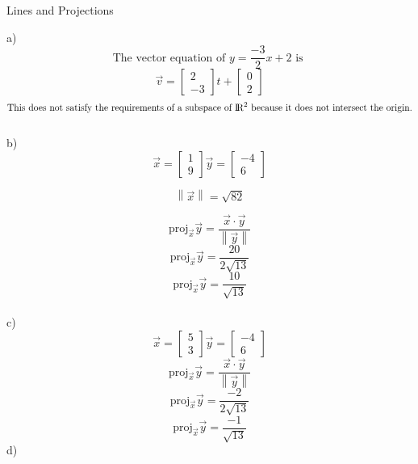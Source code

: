 \documentclass[12pt]{article}
\newcommand{\dbarl}{\left\lVert}
\newcommand{\dbarr}{\right\rVert}
\newenvironment{problem}[2][Problem]{\begin{trivlist}
\item[\hskip \labelsep {\bfseries #1}\hskip \labelsep {\bfseries #2.}]}{\end{trivlist}}
\begin{document}
\begin{problem}{5}
	Lines and Projections
\end{problem}
a)\\
	\[\text{The vector equation of } y=\frac{-3}{2}x + 2 \text{ is }\]
	\[\vec v = \left[\begin{matrix} 2\\-3 \end{matrix}\right]t + \left[\begin{matrix} 0\\2 \end{matrix}\right]\]
	\[\text{This does not satisfy the requirements of a subspace of } \rm I\!R^2 \text{ because it does not intersect the origin.}\]\\
b)\\
	\[\vec x = \left[\begin{matrix} 1\\9\end{matrix}\right] \vec y = \left[\begin{matrix} -4\\6\end{matrix}\right]\]

	\[\dbarl \vec x \dbarr = \sqrt{82}\]

	\[\text{proj}_{\vec{x}}\vec y = \frac{\vec x \cdot \vec y}{\dbarl\vec y\dbarr} \]
	\[\text{proj}_{\vec{x}}\vec y = \frac{20}{2\sqrt{13}}\]
	\[\text{proj}_{\vec{x}}\vec y = \frac{10}{\sqrt{13}}\]\\
c)\\
	\[\vec x = \left[\begin{matrix}5\\3\end{matrix}\right] \vec y = \left[\begin{matrix}-4\\6\end{matrix}\right]\]
	\[\text{proj}_{\vec x}\vec y = \frac{\vec x \cdot \vec y}{\dbarl\vec y\dbarr}\]
	\[\text{proj}_{\vec x}\vec y = \frac{-2}{2\sqrt{13}}\]
	\[\text{proj}_{\vec x}\vec y = \frac{-1}{\sqrt{13}}\]
d)\\
\end{document}
